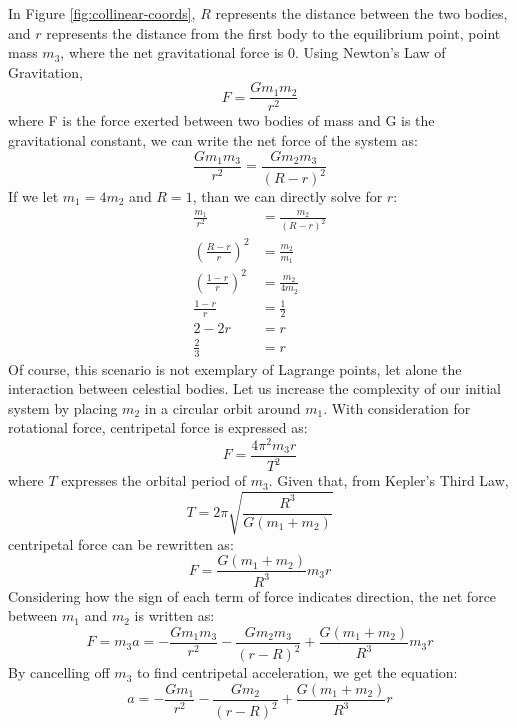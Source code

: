 In Figure \ref{fig:collinear-coords}, $R$ represents the distance between the two bodies, and $r$ represents the distance from the first body to the equilibrium point, point mass $m_3$, where the net gravitational force is 0. Using Newton's Law of Gravitation,
\begin{equation*}
	F = \frac{Gm_1m_2}{r^2}
\end{equation*}
where F is the force exerted between two bodies of mass and G is the gravitational constant, we can write the net force of the system as:
\begin{equation*}
	\frac{Gm_1m_3}{r^2} = \frac{Gm_2m_3}{(R - r)^2}
\end{equation*}
If we let $m_1 = 4m_2$ and $R = 1$, than we can directly solve for $r$:
\begin{align*}
	\frac{m_1}{r^2} &= \frac{m_2}{(R - r)^2} \\
	\left(\frac{R - r}{r}\right)^2 &= \frac{m_2}{m_1} \\
	\left(\frac{1 - r}{r}\right)^2 &= \frac{m_2}{4m_2} \\
	\frac{1 - r}{r} &= \frac{1}{2} \\
	2 - 2r &= r \\
	\frac{2}{3} &= r
\end{align*}
Of course, this scenario is not exemplary of Lagrange points, let alone the interaction between celestial bodies. Let us increase the complexity of our initial system by placing $m_2$ in a circular orbit around $m_1$. With consideration for rotational force, centripetal force is expressed as:
\begin{equation*}
	F = \frac{4\pi^2m_3r}{T^2}
\end{equation*}
where $T$ expresses the orbital period of $m_3$. Given that, from Kepler's Third Law,
\begin{equation*}
	T = 2\pi \sqrt{\frac{R^3}{G(m_1 + m_2)}}
\end{equation*}
centripetal force can be rewritten as:
\begin{equation*}
	F = \frac{G(m_1+m_2)}{R^3}m_3r
\end{equation*}
Considering how the sign of each term of force indicates direction, the net force between $m_1$ and $m_2$ is written as:
\begin{equation*}
	F = m_3a = -\frac{Gm_1m_3}{r^2} - \frac{Gm_2m_3}{(r - R)^2} + \frac{G(m_1+m_2)}{R^3}m_3r
\end{equation*}
By cancelling off $m_3$ to find centripetal acceleration, we get the equation:
\begin{equation*}
	a = -\frac{Gm_1}{r^2} - \frac{Gm_2}{(r - R)^2} + \frac{G(m_1+m_2)}{R^3}r
\end{equation*}
